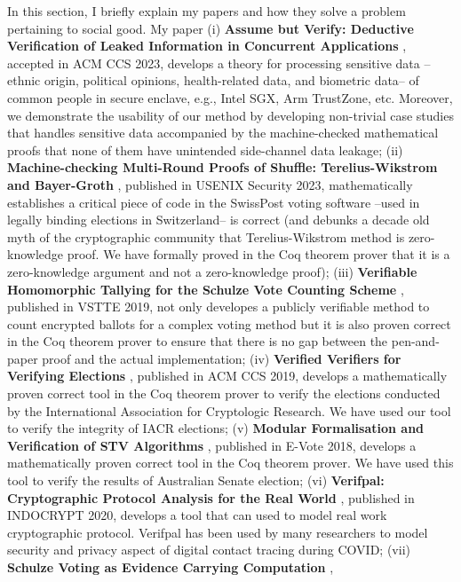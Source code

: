 \documentclass[12pt,a4paper]{article}
\begin{document}
In this section, I briefly explain my papers and how they solve a problem pertaining to social good.
My paper (i) \textbf{Assume but Verify: Deductive Verification of Leaked Information in Concurrent Applications} \cite{murrayassume},
accepted in ACM CCS 2023, develops a theory
for processing sensitive data --ethnic origin, political opinions,
health-related data, and  biometric data-- of common
people in secure enclave, e.g., Intel SGX, Arm TrustZone, etc. Moreover,
we demonstrate the usability of our method by developing non-trivial case studies that handles
sensitive data accompanied by the machine-checked mathematical proofs that none of
them have unintended side-channel data leakage;
(ii) \textbf{Machine-checking Multi-Round Proofs of Shuffle: Terelius-Wikstrom and Bayer-Groth} \cite{287095},
published in USENIX Security 2023, mathematically establishes a critical piece of
code in the SwissPost voting software --used in legally binding
elections in Switzerland-- is correct (and debunks a decade old myth of the cryptographic
community that Terelius-Wikstrom method is zero-knowledge proof. We have formally
proved in the Coq theorem prover that it is a zero-knowledge argument and not
a zero-knowledge proof);
(iii) \textbf{Verifiable Homomorphic Tallying for the Schulze Vote Counting Scheme} \cite{10.1007/978-3-030-41600-3_4}, published
in VSTTE 2019, not only developes a publicly verifiable method to count encrypted ballots for
a complex voting method but it
is also proven correct in the Coq theorem prover to ensure that there is no gap between
the pen-and-paper proof and the actual implementation;  (iv) \textbf{Verified Verifiers for
Verifying Elections} \cite{10.1145/3319535.3354247}, published in ACM CCS 2019, develops a mathematically proven correct tool
in the Coq theorem prover to verify the elections conducted by
the International Association for Cryptologic Research. We have used
our tool to verify the integrity of IACR elections; (v) \textbf{Modular Formalisation and
Verification of STV Algorithms} \cite{10.1007/978-3-030-00419-4_4}, published in E-Vote 2018, develops a mathematically proven
correct tool in the Coq theorem prover. We have used this tool to verify
the results of Australian Senate election;
(vi) \textbf{Verifpal: Cryptographic Protocol Analysis for the Real World} \cite{10.1007/978-3-030-65277-7_8}, published in
INDOCRYPT 2020, develops a tool that can used to model real work cryptographic protocol.
Verifpal has been used by many researchers to model security and privacy aspect of
digital contact tracing during COVID; (vii) \textbf{Schulze Voting as Evidence Carrying Computation} \cite{10.1007/978-3-319-66107-0_26}, 
\end{document}

